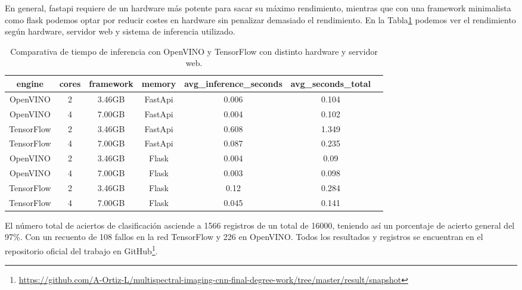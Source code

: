 En general, fastapi requiere de un hardware más potente para sacar su máximo rendimiento, mientras que con una framework minimalista como flask podemos optar por reducir costes en hardware sin penalizar demasiado el rendimiento.
En la Tabla\ref{tab:Comparativa de tiempo de inferencia con OpenVINO y TensorFlow con distinto hardware y servidor web} podemos ver el rendimiento según hardware, servidor web y sistema de inferencia utilizado.

\begin{table}[ht]
    \begin{center}
        \small
        \begin{tabular}{ | c | c | c | c| c | c | c |}
            \hline
            engine & cores & framework & memory & avg\_inference\_seconds & avg\_seconds\_total \\ \hline
            OpenVINO & 2 & 3.46GB & FastApi & 0.006 & 0.104 \\
            OpenVINO & 4 & 7.00GB & FastApi & 0.004 & 0.102 \\
            TensorFlow & 2 & 3.46GB & FastApi & 0.608 & 1.349 \\
            TensorFlow & 4 & 7.00GB & FastApi & 0.087 & 0.235 \\
            OpenVINO & 2 & 3.46GB & Flask & 0.004 & 0.09 \\
            OpenVINO & 4 & 7.00GB & Flask & 0.003 & 0.098 \\
            TensorFlow & 2 & 3.46GB & Flask & 0.12 & 0.284 \\
            TensorFlow & 4 & 7.00GB & Flask & 0.045 & 0.141 \\ \hline
        \end{tabular}
    \end{center}
    \caption{Comparativa de tiempo de inferencia con OpenVINO y TensorFlow con distinto hardware y servidor web.}
    \label{tab:Comparativa de tiempo de inferencia con OpenVINO y TensorFlow con distinto hardware y servidor web}
\end{table}


El número total de aciertos de clasificación asciende a 1566 registros de un total de 16000, teniendo así un porcentaje de acierto general
del 97\%. Con un recuento de 108 fallos en la red TensorFlow y 226 en OpenVINO.
Todos los resultados y registros se encuentran en el repositorio oficial del trabajo en GitHub\footnote{\url{https://github.com/A-Ortiz-L/multispectral-imaging-cnn-final-degree-work/tree/master/result/snapshot}}.


